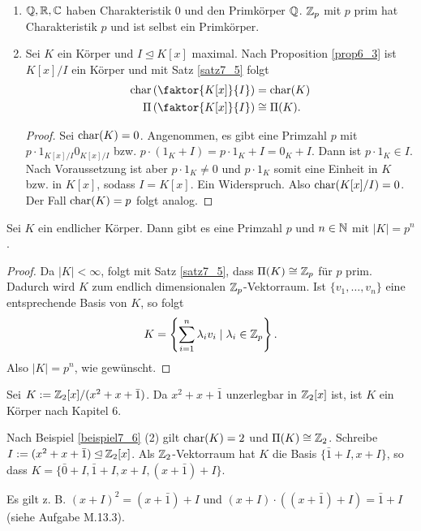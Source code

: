 \begin{beispiel}\label{beispiel7_6}
	\begin{enumerate}[label=(\arabic*)]
		\item $\mathbb{Q}, \mathbb{R}, \mathbb{C}$ haben Charakteristik $0$ und den Primkörper $\mathbb{Q}$. $\mathbb{Z}_p$ mit $p$ prim hat Charakteristik $p$ und ist selbst ein Primkörper.
		\item Sei $K$ ein Körper und $I \unlhd K[x]$ maximal. Nach Proposition \ref{prop6_3} ist $K[x] / I$ ein Körper und mit Satz \ref{satz7_5} folgt
		\begin{align*}
			\chr\left(\faktor{K[x]}{I}\right) &= \chr(K)\\
			\Pi\left(\faktor{K[x]}{I}\right) &\cong \Pi(K).
		\end{align*}
		\begin{proof}
			Sei $\mathrm{char}(K) = 0$. Angenommen, es gibt eine Primzahl $p$ mit $p \cdot 1_{K[x] / I} 0_{K[x] / I}$ bzw. $p \cdot (1_K + I) = p\cdot 1_K + I = 0_K + I$. Dann ist $p \cdot 1_K \in I$. Nach Voraussetzung ist aber $p \cdot 1_K \neq 0$ und $p \cdot 1_K$ somit eine Einheit in $K$ bzw. in $K[x]$, sodass $I = K[x]$. Ein Widerspruch. Also $\mathrm{char}(K[x] / I) = 0$. Der Fall $\mathrm{char}(K) = p$ folgt analog.
		\end{proof}
	\end{enumerate}
\end{beispiel}
\begin{kor}\label{kor7_7}
	Sei $K$ ein endlicher Körper. Dann gibt es eine Primzahl $p$ und $n \in \mathbb{N}$ mit $|K| = p^n$.
\end{kor}
\begin{proof}
	Da $|K| < \infty$, folgt mit Satz \ref{satz7_5}, dass $\Pi(K) \cong \mathbb{Z}_p$ für $p$ prim. Dadurch wird $K$ zum endlich dimensionalen $\mathbb{Z}_p$-Vektorraum. Ist $\{v_1, \dots, v_n\}$ eine entsprechende Basis von $K$, so folgt 
	\[K = \left\{\sum_{i=1}^n \lambda_i v_i \mid \lambda_i \in \mathbb{Z}_p\right\}.\]
	Also $|K| = p^n$, wie gewünscht.
\end{proof}
\begin{beispiel}\label{beispiel7_8}
	Sei $K := \mathbb{Z}_2 [x] / (x^2 + x + \bar{1})$. Da $x^2 + x + \bar{1}$ unzerlegbar in $\mathbb{Z}_2[x]$ ist, ist $K$ ein Körper nach Kapitel 6.
	
	Nach Beispiel \ref{beispiel7_6} (2) gilt $\mathrm{char}(K) = 2$ und $\Pi(K) \cong \mathbb{Z}_2$. Schreibe $I := (x^2 + x + \bar{1}) \unlhd \mathbb{Z}_2[x]$. Als $\mathbb{Z}_2$-Vektorraum hat $K$ die Basis $\{\bar{1} + I, x + I\}$, so dass $K = \{\bar{0} + I, \bar{1} + I, x+I, (x+\bar{1}) + I\}$. 
	
	Es gilt z. B. $(x+I)^2 = (x+\bar{1}) + I$ und $(x+I)\cdot ((x + \bar{1}) + I) = \bar{1} + I$ (siehe Aufgabe M.13.3).
\end{beispiel}
